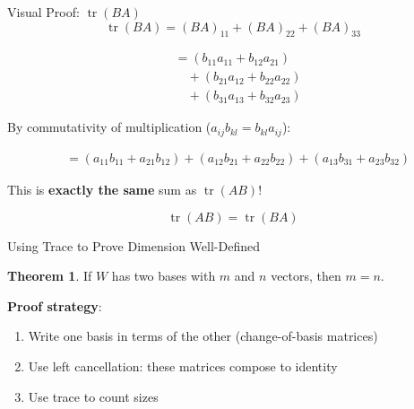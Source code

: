 \documentclass[10pt]{beamer}
\theoremstyle{definition}
\newtheorem{thm}{Theorem}[section]
\newcommand{\x}[1]{\alert{\textbf{#1}}}
\begin{document}
\begin{frame}{Visual Proof: $\operatorname{tr}(BA)$}
$$\operatorname{tr}(BA) = (BA)_{11} + (BA)_{22} + (BA)_{33}$$

\vfill
\begin{align*}
&= (b_{11}a_{11} + b_{12}a_{21}) \\
&\quad + (b_{21}a_{12} + b_{22}a_{22}) \\
&\quad + (b_{31}a_{13} + b_{32}a_{23})
\end{align*}

\vfill
By commutativity of multiplication ($a_{ij}b_{kl} = b_{kl}a_{ij}$):

\begin{align*}
&= (a_{11}b_{11} + a_{21}b_{12}) + (a_{12}b_{21} + a_{22}b_{22}) + (a_{13}b_{31} + a_{23}b_{32})
\end{align*}

\vfill
This is \x{exactly the same} sum as $\operatorname{tr}(AB)$!

$$\boxed{\operatorname{tr}(AB) = \operatorname{tr}(BA)}$$
\end{frame}

\begin{frame}{Using Trace to Prove Dimension Well-Defined}
\begin{thm}
If $W$ has two bases with $m$ and $n$ vectors, then $m = n$.
\end{thm}

\vfill
\textbf{Proof strategy}:
\begin{enumerate}
\item Write one basis in terms of the other (change-of-basis matrices)
\item Use left cancellation: these matrices compose to identity
\item Use trace to count sizes
\end{enumerate}
\end{frame}
\end{document}

